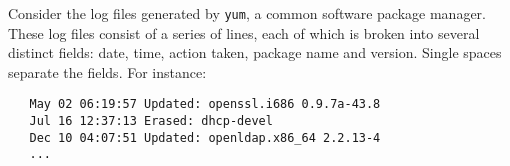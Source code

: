 
Consider
the log files generated by {\tt yum}, a common software package manager.
These log files consist of a series of lines,
each of which is broken into several distinct fields: 
date, time, action taken, package name and version. 
Single spaces separate the fields.  For instance:
{\small\begin{verbatim}
   May 02 06:19:57 Updated: openssl.i686 0.9.7a-43.8
   Jul 16 12:37:13 Erased: dhcp-devel
   Dec 10 04:07:51 Updated: openldap.x86_64 2.2.13-4
   ...
\end{verbatim}}
\normalsize
%
%
%

